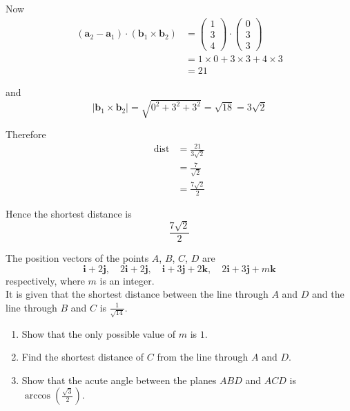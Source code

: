\documentclass[leqno]{article}
\begin{document}
\begin{enumerate}[
  label=\textbf{\arabic*.},
  leftmargin=*,
  topsep=0pt,
  partopsep=0pt,
  parsep=0pt
]
\begin{djsSolution}
\begin{enumerate}[label=\textbf{(\alph*)}]
\begin{enumerate}[label=(\roman*)]
    Now
    \begin{align*}
    (\mathbf{a}_2-\mathbf{a}_1)\cdot(\mathbf{b}_1\times\mathbf{b}_2)
    &=
    \begin{pmatrix}1\\3\\4\end{pmatrix}\cdot\begin{pmatrix}0\\3\\3\end{pmatrix}\\
    &=
    1\times 0+3\times 3+4\times 3\\
    &=
    21
    \end{align*}

    and
    \[
    \left\lvert\mathbf{b}_1\times\mathbf{b}_2\right\rvert
    =\sqrt{0^2+3^2+3^2}
    =\sqrt{18}
    =3\sqrt{2}
    \]

    Therefore
    \begin{align*}
    \mathrm{dist}
    &=
    \frac{21}{3\sqrt{2}}\\
    &=
    \frac{7}{\sqrt{2}}\\
    &=
    \frac{7\sqrt{2}}{2}
    \end{align*}

    Hence the shortest distance is
    \[
    \frac{7\sqrt{2}}{2}
    \]
  \end{enumerate}
\end{enumerate}
\end{djsSolution}


\newpage

\questionitem

The position vectors of the points $A$, $B$, $C$, $D$ are
\[
\mathbf{i}+2\mathbf{j},\quad 2\mathbf{i}+2\mathbf{j},\quad \mathbf{i}+3\mathbf{j}+2\mathbf{k},\quad 2\mathbf{i}+3\mathbf{j}+m\mathbf{k}
\]
respectively, where $m$ is an integer. \\

It is given that the shortest distance between the line through $A$ and $D$ and the line through $B$ and $C$ is $\tfrac{1}{\sqrt{14}}$. \\
\begin{enumerate}[label=\textbf{(\alph*)}]
  \item Show that the only possible value of $m$ is $1$.  \\
  \item Find the shortest distance of $C$ from the line through $A$ and $D$.  \\
  \item Show that the acute angle between the planes $ABD$ and $ACD$ is $\arccos\left(\frac{\sqrt{3}}{2}\right)$.  \\
\end{enumerate}


\end{enumerate}
\end{document}
